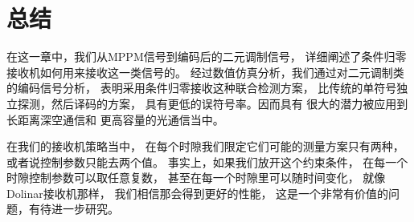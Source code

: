 \section{总结}

在这一章中，我们从MPPM信号到编码后的二元调制信号，
详细阐述了条件归零接收机如何用来接收这一类信号的。
经过数值仿真分析，我们通过对二元调制类的编码信号分析，
表明采用条件归零接收这种联合检测方案，
比传统的单符号独立探测，然后译码的方案，
具有更低的误符号率。因而具有
很大的潜力被应用到长距离深空通信和
更高容量的光通信当中。

在我们的接收机策略当中，
在每个时隙我们限定它们可能的测量方案只有两种，
或者说控制参数只能去两个值。
事实上，如果我们放开这个约束条件，
在每一个时隙控制参数可以取任意复数，
甚至在每一个时隙里可以随时间变化，
就像Dolinar接收机那样，
我们相信那会得到更好的性能，
这是一个非常有价值的问题，有待进一步研究。
